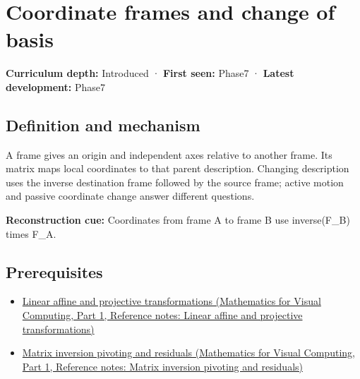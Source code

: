 \hypertarget{appendix-1bae9457dbc3}{}\label{referencestart:appendix-1bae9457dbc3}
\section{Coordinate frames and change of basis}\label{appendix-1bae9457dbc3-coordinate-frames-and-change-of-basis}

\hypertarget{appendix-1bae9457dbc3-coordinate-frames-and-change-of-basis}{}

\textbf{Curriculum depth:} Introduced · \textbf{First seen:} Phase7 · \textbf{Latest development:} Phase7

\begin{allmightroledefinition}

\subsection{Definition and mechanism}\label{appendix-1bae9457dbc3-definition-and-mechanism}

\hypertarget{appendix-1bae9457dbc3-definition-and-mechanism}{}

A frame gives an origin and independent axes relative to another frame. Its matrix maps local coordinates to that parent description. Changing description uses the inverse destination frame followed by the source frame; active motion and passive coordinate change answer different questions.

\end{allmightroledefinition}

\textbf{Reconstruction cue:} Coordinates from frame A to frame B use inverse(F\_B) times F\_A.

\subsection{Prerequisites}\label{appendix-1bae9457dbc3-prerequisites}

\hypertarget{appendix-1bae9457dbc3-prerequisites}{}

\begin{itemize}
\tightlist
\item
  \href{../02-Mathematics-for-Visual-Computing-P01/main.pdf\#appendix-0bf0ca73f735}{Linear affine and projective transformations (Mathematics for Visual Computing, Part 1, Reference notes: Linear affine and projective transformations)}
\item
  \href{../02-Mathematics-for-Visual-Computing-P01/main.pdf\#appendix-48d2e66378ab}{Matrix inversion pivoting and residuals (Mathematics for Visual Computing, Part 1, Reference notes: Matrix inversion pivoting and residuals)}
\end{itemize}

